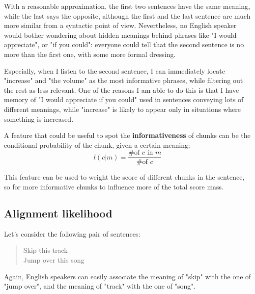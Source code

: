 With a reasonable approximation, the first two sentences have the same meaning, while the last says the opposite, although the first and the last sentence are much more similar from a syntactic point of view. Nevertheless, no English speaker would bother wondering about hidden meanings behind phrases like "I would appreciate", or "if you could": everyone could tell that the second sentence is no more than the first one, with some more formal dressing.

Especially, when I listen to the second sentence, I can immediately locate "increase" and "the volume" as the most informative phrases, while filtering out the rest as less relevant. One of the reasons I am able to do this is that I have memory of "I would appreciate if you could" used in sentences conveying lots of different meanings, while "increase" is likely to appear only in situations where something is increased.

A feature that could be useful to spot the \textbf{informativeness} of chunks can be the conditional probability of the chunk, given a certain meaning:
$$
l(c|m)=\frac{\text{\# of }c\text{ in }m}{\text{\# of }c}
$$

This feature can be used to weight the score of different chunks in the sentence, so for more informative chunks to influence more of the total score mass.
\subsection{Alignment likelihood}
Let's consider the following pair of sentences:
\begin{quote}
Skip this track \\
Jump over this song
\end{quote}
Again, English speakers can easily associate the meaning of "skip" with the one of "jump over", and the meaning of "track" with the one of "song".

